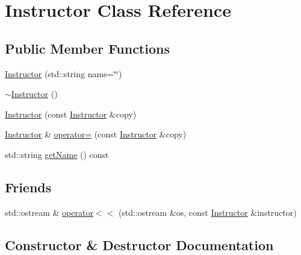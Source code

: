 \hypertarget{class_instructor}{}\section{Instructor Class Reference}
\label{class_instructor}
\subsection*{Public Member Functions}
\begin{DoxyCompactItemize}
\item 
\hyperlink{class_instructor_a9058ed409501cefb86d09bf198eea337}{Instructor} (std\+::string name=\char`\"{}\char`\"{})
\item 
\hyperlink{class_instructor_aa204bec2066fabdd81a065999b01816c}{$\sim$\+Instructor} ()
\item 
\hyperlink{class_instructor_a2b768abe02217df29acfe2578779a727}{Instructor} (const \hyperlink{class_instructor}{Instructor} \&copy)
\item 
\hyperlink{class_instructor}{Instructor} \& \hyperlink{class_instructor_a2e50fcb9fc77b593ddfecb41c041b8dd}{operator=} (const \hyperlink{class_instructor}{Instructor} \&copy)
\item 
std\+::string \hyperlink{class_instructor_a02b4be6aaa65c5aaf3cab906cf4d6e4f}{get\+Name} () const 
\end{DoxyCompactItemize}
\subsection*{Friends}
\begin{DoxyCompactItemize}
\item 
std\+::ostream \& \hyperlink{class_instructor_aa995ba808ecb0e099c9ac11fe6fec2b2}{operator$<$$<$} (std\+::ostream \&os, const \hyperlink{class_instructor}{Instructor} \&instructor)
\end{DoxyCompactItemize}


\subsection{Constructor \& Destructor Documentation}
\hypertarget{class_instructor_a9058ed409501cefb86d09bf198eea337}{}
